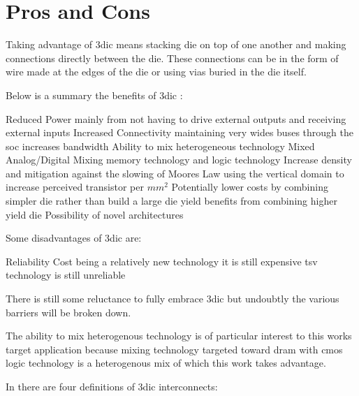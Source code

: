 \section{Pros and Cons}
\label{sec:3dic benefits}

Taking advantage of \ac{3dic} means stacking die on top of one another and making connections directly between the die. These connections can be in the form of wire made at the edges of the die or using vias buried in the die itself.


Below is a summary the benefits of \ac{3dic} :
\begin{outline}
  \1 Reduced Power
    \2 mainly from not having to drive external outputs and receiving external inputs
  \1 Increased Connectivity
    \2 maintaining very wides buses through the \ac{soc} increases bandwidth
  \1 Ability to mix heterogeneous technology
    \2 Mixed Analog/Digital
    \2 Mixing memory technology and logic technology
  \1 Increase density and mitigation against the slowing of Moores Law
    \2 using the vertical domain to increase perceived transistor per $mm^2$
  \1 Potentially lower costs by combining simpler die rather than build a large die
    \2 yield benefits from combining higher yield die
  \1 Possibility of novel architectures \cite{Kim2016}
\end{outline}

Some disadvantages of \ac{3dic} are:
\begin{outline}
  \1 Reliability
  \1 Cost
    \2 being a relatively new technology it is still expensive 
    \2 \ac{tsv} technology is still unreliable
\end{outline}

There is still some reluctance to fully embrace \ac{3dic} but undoubtly the various barriers will be broken down.

The ability to mix heterogenous technology is of particular interest to this works target application because mixing technology targeted toward \ac{dram} with cmos logic technology is a heterogenous mix of which this work takes advantage.

In \cite{itrs2015_interconn} there are four definitions of \ac{3dic} interconnects:

